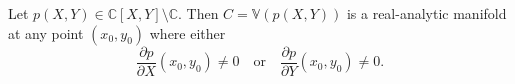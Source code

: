 Let $p(X, Y) \in \mathbb{C}[X, Y] \setminus \mathbb{C}$. Then $C = \mathbb{V}(p(X, Y))$ is a real-analytic manifold at any point $(x_0, y_0)$ where either
$$\frac{\partial p}{\partial X}(x_0, y_0) \neq 0 \quad \text{or} \quad \frac{\partial p}{\partial Y}(x_0, y_0) \neq 0.$$